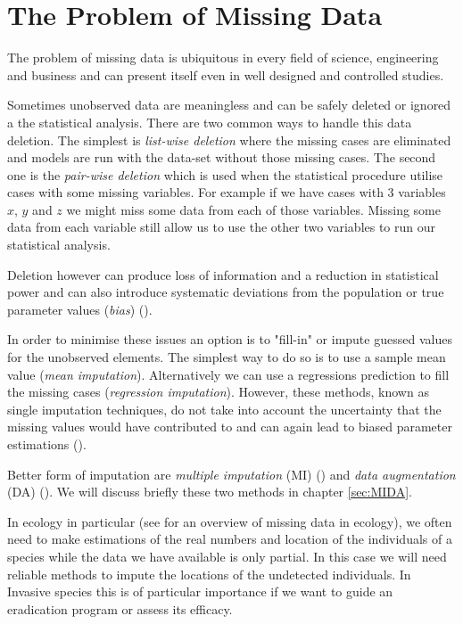 \chapter[The Problem of Missing Data]{The Problem of Missing Data}
\label{ch:MissingData}

The problem of missing data is ubiquitous in every field of science, engineering and business and can present itself even in well designed and controlled studies. 

Sometimes unobserved data are meaningless and can be safely deleted or ignored a the statistical analysis. There are two common ways to handle this data deletion. The simplest is \textit{list-wise deletion} where the missing cases are eliminated and models are run with the data-set without those missing cases. The second one is the \textit{pair-wise deletion} which is used when the statistical procedure utilise cases with some missing variables. For example if we have cases with 3 variables $x$, $y$ and $z$ we might miss some data from each of those variables. Missing some data from each variable still allow us to use the other two variables to run our statistical analysis.

Deletion however can produce loss of information and a reduction in statistical power and can also introduce systematic deviations from the population or true parameter values (\textit{bias}) (\cite{Nakagawa}).

In order to minimise these issues an option is to "fill-in" or impute guessed values for the unobserved elements. The simplest way to do so is to use a sample mean value (\textit{mean imputation}). Alternatively we can use a regressions prediction to fill the missing cases (\textit{regression imputation}). However, these methods, known as single imputation techniques, do not take into account the uncertainty that the missing values would have contributed to and can again lead to biased parameter estimations (\cite{Nakagawa}).

Better form of imputation are \textit{multiple imputation} (MI) (\cite{RubinMI}) and \textit{data augmentation} (DA) (\cite{Tanner}). We will discuss briefly these two methods in chapter \ref{sec:MIDA}.

In ecology in particular (see \cite{Nakagawa} for an overview of missing data in ecology), we often need to make estimations of the real numbers and location of the individuals of a species while the data we have available is only partial. In this case we will need reliable methods to impute the locations of the undetected individuals. In Invasive species this is of particular importance if we want to guide an eradication program or assess its efficacy.






